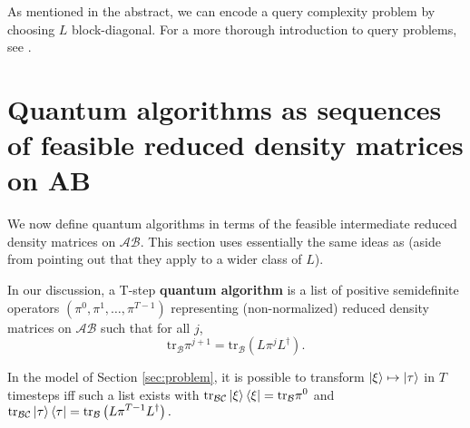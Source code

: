 \documentclass{article}
\begin{document}
As mentioned in the abstract, we can encode a query complexity problem by choosing $\displaystyle L$ block-diagonal. For a more thorough introduction to query problems, see \cite{belovs2015variations}.
\section{Quantum algorithms as sequences of feasible reduced density matrices on AB}
\label{sec:quantum-feasible-rdms}

We now define quantum algorithms in terms of the feasible intermediate reduced density matrices on $\displaystyle \mathcal{AB}$. This section uses essentially the same ideas as \cite{BarnumQuantum, Barnum2007Semidefinite} (aside from pointing out that they apply to a wider class of $\displaystyle L$).
\begin{definition}\label{def:QuantumAlgRDMSequence}
In our discussion, a T-step \textbf{quantum algorithm }is a list of positive semidefinite operators $\displaystyle \left( \pi ^{0} ,\pi ^{1} ,\dotsc ,\pi ^{T-1}\right)$ representing (non-normalized) reduced density matrices on $\displaystyle \mathcal{AB}$ such that for all $\displaystyle j$,
\begin{equation}
\mathrm{tr}_{\mathcal{B}} \pi ^{j+1} =\mathrm{tr}_{\mathcal{B}}\left( L \pi ^{j} L^{\dagger }\right) .
\end{equation}
\end{definition}
\begin{proposition}
In the model of Section \ref{sec:problem}, it is possible to transform $\displaystyle \ket{\xi } \mapsto \ket{\tau }$ in $\displaystyle T$ timesteps iff such a list exists with $\displaystyle \mathrm{tr}_{\mathcal{BC}}\ket{\xi }\bra{\xi } =\mathrm{tr}_{\mathcal{B}} \pi ^{0}$ and $\displaystyle \mathrm{tr}_{\mathcal{BC}}\ket{\tau }\bra{\tau } =\mathrm{tr}_{\mathcal{B}}\left( L \pi ^{T-1} L^{\dagger }\right) .$
\end{proposition}
\end{document}
